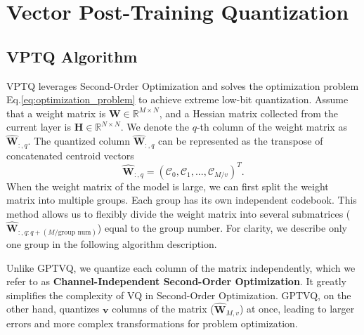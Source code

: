 \section{Vector Post-Training Quantization} \label{sec:vptq}
\vspace{-0.05in}



\subsection{VPTQ Algorithm} \label{sec:vptq_detail}
\vspace{-0.05in}

VPTQ leverages Second-Order Optimization and solves the optimization problem Eq.\ref{eq:optimization_problem} to achieve extreme low-bit quantization.
Assume that a weight matrix is $\mathbf{W} \in \mathbb{R}^{M \times N}$, and a Hessian matrix collected from the current layer is $\mathbf{H} \in \mathbb{R}^{N \times N}$. 
We denote the $q$-th column of the weight matrix as $\hat{\mathbf{W}}_{:,q}$. 
The quantized column $\hat{\mathbf{W}}_{:,q}$ can be represented as the transpose of concatenated centroid vectors
\begin{equation*}
    \hat{\mathbf{W}}_{:,q} = (\mathcal{C}_{0},\mathcal{C}_{1}, ... , \mathcal{C}_{M/v})^{T}.
\end{equation*}
When the weight matrix of the model is large, we can first split the weight matrix into multiple groups. Each group has its own independent codebook. This method allows us to flexibly divide the weight matrix into several submatrices ($\hat{\mathbf{W}}_{:,q:q+(M/\text{group num})}$) equal to the group number. 
For clarity, we describe only one group in the following algorithm description.

Unlike GPTVQ, we quantize each column of the matrix independently, which we refer to as \textbf{Channel-Independent Second-Order Optimization}. 
It greatly simplifies the complexity of VQ in Second-Order Optimization. 
GPTVQ, on the other hand, quantizes $\boldsymbol{v}$ columns of the matrix ($\hat{\mathbf{W}}_{M,v}$) at once, leading to larger errors and more complex transformations for problem optimization.


